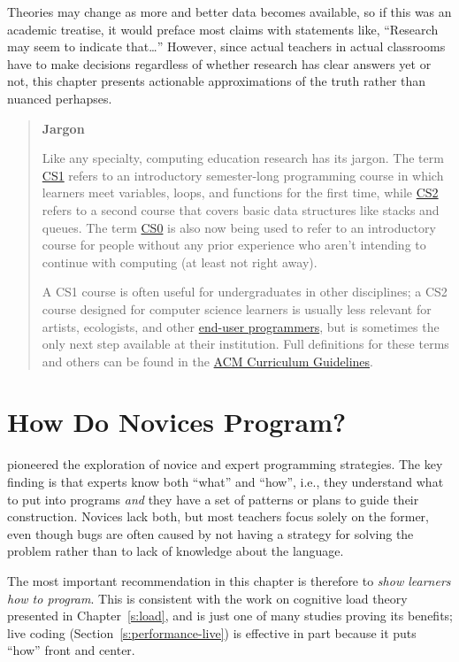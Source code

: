 Theories may change as more and better data becomes available, so if
this was an academic treatise, it would preface most claims with
statements like, ``Research may seem to indicate that\ldots{}''
However, since actual teachers in actual classrooms have to make
decisions regardless of whether research has clear answers yet or not,
this chapter presents actionable approximations of the truth rather than
nuanced perhapses.

\begin{quote}\setlength{\parindent}{0pt}
\textbf{Jargon}

Like any specialty, computing education research has its jargon. The
term \protect\hyperlink{g:cs1}{CS1} refers to an introductory semester-long
programming course in which learners meet variables, loops, and
functions for the first time, while \protect\hyperlink{g:cs2}{CS2} refers to
a second course that covers basic data structures like stacks and
queues. The term \protect\hyperlink{g:cs0}{CS0} is also now being used to
refer to an introductory course for people without any prior
experience who aren't intending to continue with computing (at least
not right away).

A CS1 course is often useful for undergraduates in other
disciplines; a CS2 course designed for computer science learners is
usually less relevant for artists, ecologists, and other \protect\hyperlink{g:end-user-programmer}{end-user
programmers}, but is sometimes the only next
step available at their institution. Full definitions for these
terms and others can be found in the \href{https://www.acm.org/education/curricula-recommendations}{ACM Curriculum
Guidelines}.
\end{quote}

\section{How Do Novices Program?}\label{s:pck-programming}

\cite{Solo1984,Solo1986} pioneered the exploration of novice and
expert programming strategies. The key finding is that experts know both
``what'' and ``how'', i.e., they understand what to put into programs \emph{and}
they have a set of patterns or plans to guide their construction.
Novices lack both, but most teachers focus solely on the former, even
though bugs are often caused by not having a strategy for solving the
problem rather than to lack of knowledge about the language.

The most important recommendation in this chapter is therefore to \emph{show
learners how to program}. This is consistent with the work on cognitive
load theory presented in Chapter~\ref{s:load}, and \cite{Mull2007b} is
just one of many studies proving its benefits; live coding
(Section~\ref{s:performance-live}) is effective in part because it puts
``how'' front and center.

